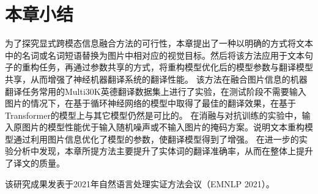 






\section{本章小结}
为了探究显式跨模态信息融合方法的可行性，本章提出了一种以明确的方式将文本中的名词或名词短语替换为图片中相对应的视觉目标。然后将该方法应用于文本句子的重构任务，再通过参数共享的方式，将重构模型优化后的模型参数与翻译模型共享，从而增强了神经机器翻译系统的翻译性能。
该方法在融合图片信息的机器翻译任务常用的Multi30K英德翻译数据集上进行了实验，在测试阶段不需要输入图片的情况下，在基于循环神经网络的模型中取得了最佳的翻译效果，在基于Transformer的模型上与其它模型仍然是可比的。
在消融与对抗训练的实验中，输入原图片的模型性能优于输入随机噪声或不输入图片的掩码方案。说明文本重构模型通过利用图片信息优化了模型的参数，使翻译模型得到了增强。
在进一步的实验分析中发现，本章所提方法主要提升了实体词的翻译准确率，从而在整体上提升了译文的质量。

该研究成果发表于2021年自然语言处理实证方法会议（EMNLP 2021）。

